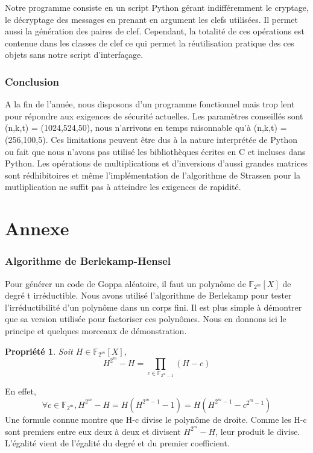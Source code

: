 \documentclass{article}
\newtheorem{prop}{Propriété}
\begin{document}
			Notre programme consiste en un script Python gérant indifféremment le cryptage, le décryptage des messages en prenant en argument les clefs utilisées.
			Il permet aussi la génération des paires de clef.
			Cependant, la totalité de ces opérations est contenue dans les classes de clef ce qui permet la réutilisation pratique des ces objets sans notre script d’interfaçage.

	\section{Conclusion}

		A la fin de l'année, nous disposons d'un programme fonctionnel mais trop lent pour répondre aux exigences de sécurité actuelles.
		Les paramètres conseillés sont (n,k,t) = (1024,524,50), nous n'arrivons en temps raisonnable qu'à (n,k,t) = (256,100,5).
		Ces limitations peuvent être dus à la nature interprétée de Python ou fait que nous n'avons pas utilisé les bibliothèques écrites en C et incluses dans Python.
		Les opérations de multiplications et d'inversions d'aussi grandes matrices sont rédhibitoires et même l'implémentation de l'algorithme de Strassen pour la mutliplication ne suffit pas à atteindre les exigences de rapidité.




\newpage
\appendix
\part*{Annexe}
	
	\section{Algorithme de Berlekamp-Hensel}
		\label{BH}
		\cite{berlekamp}
		Pour générer un code de Goppa aléatoire, il faut un polynôme de $ \mathbb{F}_{2^{m}}[X] $ de degré t irréductible.
		Nous avons utilisé l'algorithme de Berlekamp pour tester l'irréductibilité d'un polynôme dans un corps fini.
		Il est plus simple à démontrer que sa version utilisée pour factoriser ces polynômes.
		Nous en donnons ici le principe et quelques morceaux de démonstration.

		\begin{prop}
			Soit $H \in \mathbb{F}_{2^{m}}[X]$, 
			$$H^{2^{m}} - H = \prod_{c \in \mathbb{F}_{2^{m}-1}}(H-c)$$
		\end{prop}
		En effet,
		$$ \forall c \in \mathbb{F}_{2^{m}}, H^{2^{m}}-H = H(H^{2^{m}-1}-1) = H(H^{2^{m}-1}-c^{2^{m}-1})$$
		Une formule connue montre que H-c divise le polynôme de droite.
		Comme les H-c sont premiers entre eux deux à deux et divisent $ H^{2^{m}} -H $, leur produit le divise.
		L'égalité vient de l'égalité du degré et du premier coefficient.
\end{document}

